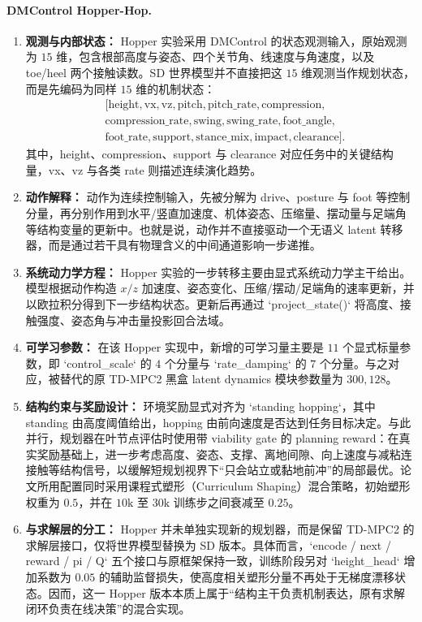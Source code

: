 \documentclass[UTF8]{ctexart}
\let\oldparagraph\paragraph
\renewcommand{\paragraph}[1]{\oldparagraph{#1}\mbox{}}
\begin{document}
\paragraph{DMControl Hopper-Hop.}
{\color{red}
\begin{enumerate}
\item \textbf{观测与内部状态：} Hopper 实验采用 DMControl 的状态观测输入，原始观测为 \(15\) 维，包含根部高度与姿态、四个关节角、线速度与角速度，以及 toe/heel 两个接触读数。SD 世界模型并不直接把这 \(15\) 维观测当作规划状态，而是先编码为同样 \(15\) 维的机制状态：
\[
\begin{aligned}
&[\text{height},\text{vx},\text{vz},\text{pitch},\text{pitch\_rate},\text{compression},\\
&\text{compression\_rate},\text{swing},\text{swing\_rate},\text{foot\_angle},\\
&\text{foot\_rate},\text{support},\text{stance\_mix},\text{impact},\text{clearance}].
\end{aligned}
\]
其中，height、compression、support 与 clearance 对应任务中的关键结构量，vx、vz 与各类 rate 则描述连续演化趋势。
\item \textbf{动作解释：} 动作为连续控制输入，先被分解为 drive、posture 与 foot 等控制分量，再分别作用到水平/竖直加速度、机体姿态、压缩量、摆动量与足端角等结构变量的更新中。也就是说，动作并不直接驱动一个无语义 latent 转移器，而是通过若干具有物理含义的中间通道影响一步递推。
\item \textbf{系统动力学方程：} Hopper 实验的一步转移主要由显式系统动力学主干给出。模型根据动作构造 \(x/z\) 加速度、姿态变化、压缩/摆动/足端角的速率更新，并以欧拉积分得到下一步结构状态。更新后再通过 `project\_state()` 将高度、接触强度、姿态角与冲击量投影回合法域。
\item \textbf{可学习参数：} 在该 Hopper 实现中，新增的可学习量主要是 \(11\) 个显式标量参数，即 `control\_scale` 的 \(4\) 个分量与 `rate\_damping` 的 \(7\) 个分量。与之对应，被替代的原 TD-MPC2 黑盒 latent dynamics 模块参数量为 \(300{,}128\)。
\item \textbf{结构约束与奖励设计：} 环境奖励显式对齐为 `standing \times hopping`，其中 standing 由高度阈值给出，hopping 由前向速度是否达到任务目标决定。与此并行，规划器在叶节点评估时使用带 viability gate 的 planning reward：在真实奖励基础上，进一步考虑高度、姿态、支撑、离地间隙、向上速度与减粘连接触等结构信号，以缓解短规划视界下“只会站立或黏地前冲”的局部最优。论文所用配置同时采用课程式塑形（Curriculum Shaping）混合策略，初始塑形权重为 \(0.5\)，并在 \(10\text{k}\) 至 \(30\text{k}\) 训练步之间衰减至 \(0.25\)。
\item \textbf{与求解层的分工：} Hopper 并未单独实现新的规划器，而是保留 TD-MPC2 的求解层接口，仅将世界模型替换为 SD 版本。具体而言，`encode / next / reward / pi / Q` 五个接口与原框架保持一致，训练阶段另对 `height\_head` 增加系数为 \(0.05\) 的辅助监督损失，使高度相关塑形分量不再处于无梯度漂移状态。因而，这一 Hopper 版本本质上属于“结构主干负责机制表达，原有求解闭环负责在线决策”的混合实现。
\end{enumerate}
}
\end{document}
